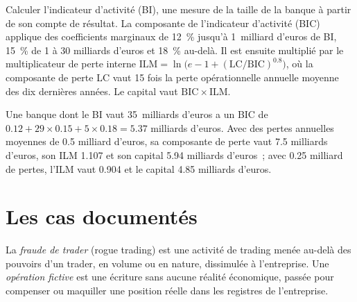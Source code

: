 \begin{method}\label{met:rc:operational-risk-and-rogue-trading:sa}
Calculer l'indicateur d'activité (BI), une mesure de la taille de la banque à partir de son compte de résultat. La
composante de l'indicateur d'activité (BIC) applique des coefficients marginaux de 12~\% jusqu'à 1~milliard d'euros de BI, 15~\%
de 1 à 30 milliards d'euros et 18~\% au-delà. Il est ensuite multiplié par le multiplicateur de perte interne
$\mathrm{ILM} = \ln\bigl(e-1+(\mathrm{LC}/\mathrm{BIC})^{0.8}\bigr)$, où la composante de perte LC vaut 15 fois la
perte opérationnelle annuelle moyenne des dix dernières années. Le capital vaut $\mathrm{BIC}\times\mathrm{ILM}$.
\end{method}

\begin{example}\label{ex:rc:operational-risk-and-rogue-trading:capital}
Une banque dont le BI vaut 35~milliards d'euros a un BIC de $0.12+29\times0.15+5\times0.18 = 5.37$ milliards d'euros. Avec des pertes
annuelles moyennes de 0.5 milliard d'euros, sa composante de perte vaut 7.5 milliards d'euros, son ILM 1.107 et son capital 5.94 milliards d'euros~;
avec 0.25 milliard de pertes, l'ILM vaut 0.904 et le capital 4.85 milliards d'euros.
\end{example}

\section{Les cas documentés}

\begin{definition}\label{def:rc:operational-risk-and-rogue-trading:rogue}
La \emph{fraude de trader} (rogue trading) est une activité de trading menée au-delà des pouvoirs d'un trader, en volume ou en nature,
dissimulée à l'entreprise. Une \emph{opération fictive} est une écriture sans aucune réalité économique,
passée pour compenser ou maquiller une position réelle dans les registres de l'entreprise.
\end{definition}

